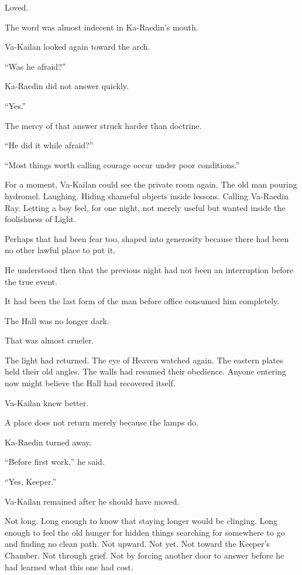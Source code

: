 Loved.\par
The word was almost indecent in Ka-Raedin’s mouth.\par
Va-Kailan looked again toward the arch.\par
“Was he afraid?”\par
Ka-Raedin did not answer quickly.\par
“Yes.”\par
The mercy of that answer struck harder than doctrine.\par
“He did it while afraid?”\par
“Most things worth calling courage occur under poor conditions.”\par
For a moment, Va-Kailan could see the private room again.
The old man pouring hydromel.
Laughing.
Hiding shameful objects inside lessons.
Calling Va-Raedin Ray.
Letting a boy feel, for one night, not merely useful but wanted inside the foolishness of Light.\par
Perhaps that had been fear too, shaped into generosity because there had been no other lawful place to put it.\par
He understood then that the previous night had not been an interruption before the true event.\par
It had been the last form of the man before office consumed him completely.\par
The Hall was no longer dark.\par
That was almost crueler.\par
The light had returned.
The eye of Heaven watched again.
The eastern plates held their old angles.
The walls had resumed their obedience.
Anyone entering now might believe the Hall had recovered itself.\par
Va-Kailan knew better.\par
A place does not return merely because the lamps do.\par
Ka-Raedin turned away.\par
“Before first work,” he said.\par
“Yes, Keeper.”\par
Va-Kailan remained after he should have moved.\par
Not long.
Long enough to know that staying longer would be clinging.
Long enough to feel the old hunger for hidden things searching for somewhere to go and finding no clean path.
Not upward.
Not yet.
Not toward the Keeper’s Chamber.
Not through grief.
Not by forcing another door to answer before he had learned what this one had cost.\par
